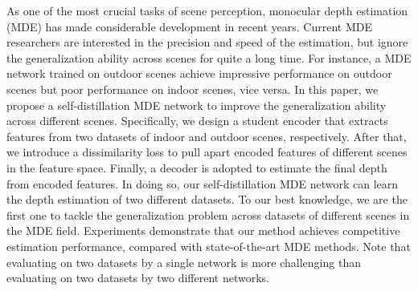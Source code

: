 \documentclass{assignment}
\date{Feb 11, 2022}
\begin{document}

\begin{problemlist}
\pbitem 


\begin{problem}
\begin{answer}


  As one of the most crucial tasks of scene perception, monocular depth estimation (MDE) has made
  considerable development in recent years. Current MDE researchers are interested in the precision and speed of
  the estimation, but ignore the generalization ability across scenes for quite a long time. For instance, a MDE
  network trained on outdoor scenes achieve impressive performance on outdoor scenes but poor performance on
  indoor scenes, vice versa. In this paper, we propose a self-distillation MDE network to improve the generalization
  ability across different scenes. Specifically, we design a student encoder that extracts features from two datasets of
  indoor and outdoor scenes, respectively. After that, we introduce a dissimilarity loss to pull apart encoded features
  of different scenes in the feature space. Finally, a decoder is adopted to estimate the final depth from encoded
  features. In doing so, our self-distillation MDE network can learn the depth estimation of two different datasets. To
  our best knowledge, we are the first one to tackle the generalization problem across datasets of different scenes in
  the MDE field. Experiments demonstrate that our method achieves competitive estimation performance, compared
  with state-of-the-art MDE methods. Note that evaluating on two datasets by a single network is more challenging
  than evaluating on two datasets by two different networks.
\end{answer}
\end{problem}








\end{problemlist}
\end{document}
